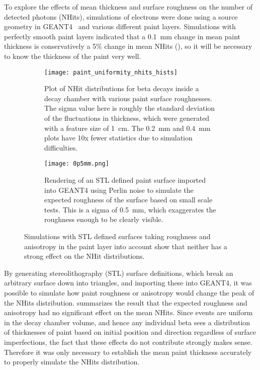 To explore the effects of mean thickness and surface roughness on the number of detected photons (NHits), simulations of \Li electrons were done using a source geometry in GEANT4~\cite{geant4} and various different paint layers. Simulations with perfectly smooth paint layers indicated that a 0.1~mm change in mean paint thickness is conservatively a 5\% change in mean NHits (), so it will be necessary to know the thickness of the paint very well. 

\begin{figure}
\begin{subfigure}{.53\textwidth}
\texttt{[image: paint\_uniformity\_nhits\_hists]}
\caption{Plot of NHit distributions for \Li beta decays inside a decay chamber with various paint surface roughnesses. The sigma value here is roughly the standard deviation of the fluctuations in thickness, which were generated with a feature size of 1~cm. The 0.2~mm and 0.4~mm plots have 10x fewer statistics due to simulation difficulties.}
\label{fig:simulations}
\end{subfigure}
\hspace{0.5cm}
\begin{subfigure}{.38\textwidth}
\centering
\texttt{[image: 0p5mm.png]}
\caption{Rendering of an STL defined paint surface imported into GEANT4 using Perlin noise to simulate the expected roughness of the surface based on small scale tests. This is a sigma of 0.5~mm, which exaggerates the roughness enough to be clearly visible.}
\label{fig:rough_sphere}
\end{subfigure}
\caption{Simulations with STL defined surfaces taking roughness and anisotropy in the paint layer into account show that neither has a strong effect on the NHit distributions.}
\label{fig:stltests}
\end{figure}

By generating stereolithography (STL) surface definitions, which break an arbitrary surface down into triangles, and importing these into GEANT4, it was possible to simulate how paint roughness or anisotropy would change the peak of the NHits distribution. 
 summarizes the result that the expected roughness and anisotropy had no significant effect on the mean NHits. 
Since events are uniform in the decay chamber volume, and hence any individual beta sees a distribution of thicknesses of paint based on initial position and direction regardless of surface imperfections, the fact that these effects do not contribute strongly makes sense. 
Therefore it was only necessary to establish the mean paint thickness accurately to properly simulate the NHits distribution.


